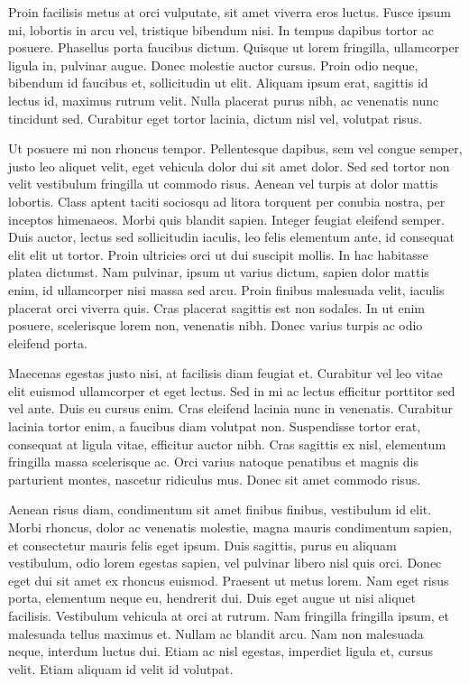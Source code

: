 \documentclass[12pt]{article}
\begin{document}
Proin facilisis metus at orci vulputate, sit amet viverra eros luctus. Fusce ipsum mi, lobortis in arcu vel, tristique bibendum nisi. In tempus dapibus tortor ac posuere. Phasellus porta faucibus dictum. Quisque ut lorem fringilla, ullamcorper ligula in, pulvinar augue. Donec molestie auctor cursus. Proin odio neque, bibendum id faucibus et, sollicitudin ut elit. Aliquam ipsum erat, sagittis id lectus id, maximus rutrum velit. Nulla placerat purus nibh, ac venenatis nunc tincidunt sed. Curabitur eget tortor lacinia, dictum nisl vel, volutpat risus.

Ut posuere mi non rhoncus tempor. Pellentesque dapibus, sem vel congue semper, justo leo aliquet velit, eget vehicula dolor dui sit amet dolor. Sed sed tortor non velit vestibulum fringilla ut commodo risus. Aenean vel turpis at dolor mattis lobortis. Class aptent taciti sociosqu ad litora torquent per conubia nostra, per inceptos himenaeos. Morbi quis blandit sapien. Integer feugiat eleifend semper. Duis auctor, lectus sed sollicitudin iaculis, leo felis elementum ante, id consequat elit elit ut tortor. Proin ultricies orci ut dui suscipit mollis. In hac habitasse platea dictumst. Nam pulvinar, ipsum ut varius dictum, sapien dolor mattis enim, id ullamcorper nisi massa sed arcu. Proin finibus malesuada velit, iaculis placerat orci viverra quis. Cras placerat sagittis est non sodales. In ut enim posuere, scelerisque lorem non, venenatis nibh. Donec varius turpis ac odio eleifend porta.

Maecenas egestas justo nisi, at facilisis diam feugiat et. Curabitur vel leo vitae elit euismod ullamcorper et eget lectus. Sed in mi ac lectus efficitur porttitor sed vel ante. Duis eu cursus enim. Cras eleifend lacinia nunc in venenatis. Curabitur lacinia tortor enim, a faucibus diam volutpat non. Suspendisse tortor erat, consequat at ligula vitae, efficitur auctor nibh. Cras sagittis ex nisl, elementum fringilla massa scelerisque ac. Orci varius natoque penatibus et magnis dis parturient montes, nascetur ridiculus mus. Donec sit amet commodo risus.

Aenean risus diam, condimentum sit amet finibus finibus, vestibulum id elit. Morbi rhoncus, dolor ac venenatis molestie, magna mauris condimentum sapien, et consectetur mauris felis eget ipsum. Duis sagittis, purus eu aliquam vestibulum, odio lorem egestas sapien, vel pulvinar libero nisl quis orci. Donec eget dui sit amet ex rhoncus euismod. Praesent ut metus lorem. Nam eget risus porta, elementum neque eu, hendrerit dui. Duis eget augue ut nisi aliquet facilisis. Vestibulum vehicula at orci at rutrum. Nam fringilla fringilla ipsum, et malesuada tellus maximus et. Nullam ac blandit arcu. Nam non malesuada neque, interdum luctus dui. Etiam ac nisl egestas, imperdiet ligula et, cursus velit. Etiam aliquam id velit id volutpat.
\end{document}
